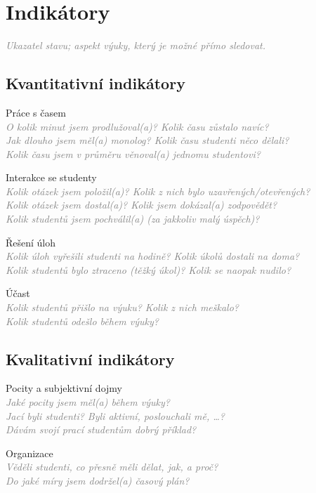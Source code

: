 \documentclass[twoside,openany]{book}
\newcommand{\note}[1]{\textcolor{gray}{\small\itshape #1}}
\begin{document}
\chapter*{Indikátory}
\label{indikatory}
\vspace{-0.5em}
\note{Ukazatel stavu; aspekt výuky, který je možné přímo sledovat.}

\section*{Kvantitativní indikátory}

Práce s časem\\
\note{O kolik minut jsem prodlužoval(a)? Kolik času zůstalo navíc?\\
Jak dlouho jsem měl(a) monolog? Kolik času studenti něco dělali?\\
Kolik času jsem v průměru věnoval(a) jednomu studentovi?}

Interakce se studenty\\
\note{Kolik otázek jsem položil(a)? Kolik z nich bylo uzavřených/otevřených?\\
Kolik otázek jsem dostal(a)? Kolik jsem dokázal(a) zodpovědět?\\
Kolik studentů jsem pochválil(a) (za jakkoliv malý úspěch)?}

Řešení úloh\\
\note{Kolik úloh vyřešili studenti na hodině? Kolik úkolů dostali na doma?\\
Kolik studentů bylo ztraceno (těžký úkol)? Kolik se naopak nudilo?}

Účast\\
\note{Kolik studentů přišlo na výuku? Kolik z nich meškalo?\\
Kolik studentů odešlo během výuky?}

\section*{Kvalitativní indikátory}

Pocity a subjektivní dojmy\\
\note{Jaké pocity jsem měl(a) během výuky?\\
Jací byli studenti? Byli aktivní, poslouchali mě, \dots?\\
Dávám svojí prací studentům dobrý příklad?}

Organizace\\
\note{Věděli studenti, co přesně měli dělat, jak, a proč?\\
Do jaké míry jsem dodržel(a) časový plán?}
\end{document}
